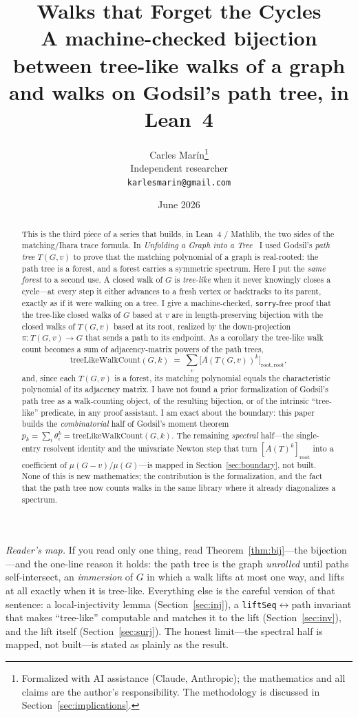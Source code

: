 \documentclass[11pt]{article}
\title{\bf Walks that Forget the Cycles\\[4pt]
  \large\normalfont A machine-checked bijection between tree-like walks of a graph
  and walks on Godsil's path tree, in Lean~4}
\author{Carles Mar\'in\thanks{Formalized with AI assistance (Claude, Anthropic); the mathematics
and all claims are the author's responsibility. The methodology is discussed in
Section~\ref{sec:implications}.}\\[3pt]
  \normalsize Independent researcher\\
  \normalsize \texttt{karlesmarin@gmail.com}}
\date{June 2026}
\newcommand{\lean}[1]{\texttt{#1}}
\begin{document}
\maketitle

\begin{abstract}
This is the third piece of a series that builds, in Lean~4 / Mathlib, the two sides of the
matching/Ihara trace formula. In \emph{Unfolding a Graph into a Tree}~\cite{PartII} I used Godsil's
\emph{path tree} $T(G,v)$ to prove that the matching polynomial of a graph is real-rooted: the path
tree is a forest, and a forest carries a symmetric spectrum. Here I put the \emph{same forest} to a
second use. A closed walk of $G$ is \emph{tree-like} when it never knowingly closes a cycle---at
every step it either advances to a fresh vertex or backtracks to its parent, exactly as if it were
walking on a tree. I give a machine-checked, \lean{sorry}-free proof that the tree-like closed walks
of $G$ based at $v$ are in length-preserving bijection with the closed walks of $T(G,v)$ based at its
root, realized by the down-projection $\pi\colon T(G,v)\to G$ that sends a path to its endpoint. As a
corollary the tree-like walk count becomes a sum of adjacency-matrix powers of the path trees,
\[
  \mathrm{treeLikeWalkCount}(G,k)\;=\;\sum_{v}\bigl[A(T(G,v))^{k}\bigr]_{\mathrm{root},\mathrm{root}},
\]
and, since each $T(G,v)$ is a forest, its matching polynomial equals the characteristic polynomial of
its adjacency matrix. I have not found a prior formalization of Godsil's path tree as a
walk-counting object, of the resulting bijection, or of the intrinsic ``tree-like'' predicate, in
any proof assistant. I am exact about the boundary: this paper builds the \emph{combinatorial} half
of Godsil's moment theorem $p_k=\sum_i\theta_i^{k}=\mathrm{treeLikeWalkCount}(G,k)$. The remaining
\emph{spectral} half---the single-entry resolvent identity and the univariate Newton step that turn
$[A(T)^k]_{\mathrm{root}}$ into a coefficient of $\mu(G-v)/\mu(G)$---is mapped in
Section~\ref{sec:boundary}, not built. None of this is new mathematics; the contribution is the
formalization, and the fact that the path tree now counts walks in the same library where it already
diagonalizes a spectrum.
\end{abstract}

\noindent\emph{Reader's map.} If you read only one thing, read
Theorem~\ref{thm:bij}---the bijection---and the one-line reason it holds: the path tree is the graph
\emph{unrolled} until paths self-intersect, an \emph{immersion} of $G$ in which a walk lifts at most
one way, and lifts at all exactly when it is tree-like. Everything else is the careful version of
that sentence: a local-injectivity lemma (Section~\ref{sec:inj}), a \lean{liftSeq}$\leftrightarrow$path
invariant that makes ``tree-like'' computable and matches it to the lift (Section~\ref{sec:inv}), and
the lift itself (Section~\ref{sec:surj}). The honest limit---the spectral half is mapped, not
built---is stated as plainly as the result.
\end{document}
